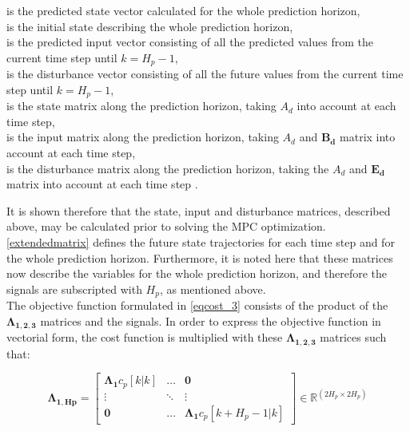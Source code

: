  \begin{minipage}[t]{0.70\textwidth}
 \vspace*{2mm}
 is the predicted state vector calculated for the whole prediction horizon, \\
 is the initial state describing the whole prediction horizon, \\
 is the predicted input vector consisting of all the predicted values from the current time step until $k = H_p-1$, \\
 is the disturbance vector consisting of all the future values from the current time step until $k = H_p-1$, \\
 is the state matrix along the prediction horizon, taking $A_d$ into account at each time step, \\
 is the input matrix along the prediction horizon, taking $A_d$ and $\bm{B_d}$ matrix into account at each time step, \\
 is the disturbance matrix along the prediction horizon, taking the $A_d$ and $\bm{E_d}$ matrix into account at each time step . \\ 
 \end{minipage}

It is shown therefore that the state, input and disturbance matrices, described above, may be calculated prior to solving the MPC optimization. \eqref{extendedmatrix} defines the future state trajectories for each time step and for the whole prediction horizon. Furthermore, it is noted here that these matrices now describe the variables for the whole prediction horizon, and therefore the signals are subscripted with $H_p$, as mentioned above. 
\\
\newline
The objective function formulated in \eqref{eqcost_3} consists of the product of the $\bm{\Lambda_{1,2,3}}$ matrices and the signals. In order to express the objective function in vectorial form, the cost function is multiplied with these $\bm{\Lambda_{1,2,3}}$ matrices such that:

\begin{equation}
\bm{\Lambda_{1,Hp}} =
 \begin{bmatrix}
 \bm{\Lambda_1} c_p[k|k] & \hdots & \bm{0} \\
 \vdots & \ddots & \vdots\\
 \bm{0} & \hdots & \bm{\Lambda_1} c_p[k+H_p-1|k] 
 \end{bmatrix}
 \in \pmb{\mathbb{R}}^{(2 H_p \times 2 H_p)}
\end{equation} 


